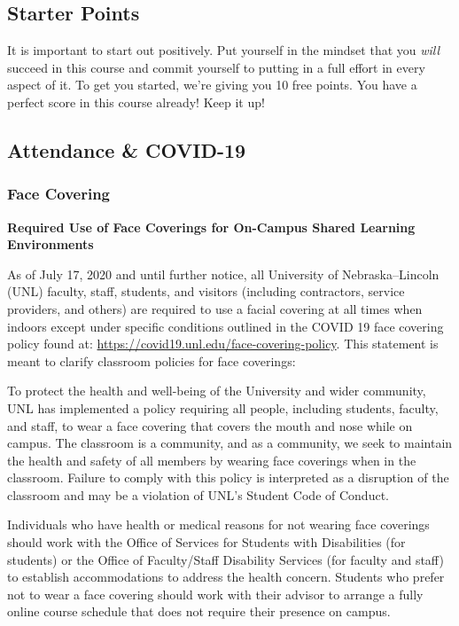 \documentclass[12pt]{scrartcl}
\begin{document}
\subsection{Starter Points}

It is important to start out positively.  Put yourself in the mindset
that you \emph{will} succeed in this course and commit yourself to
putting in a full effort in every aspect of it.  To get you started,
we're giving you 10 free points.  You have a perfect score in this
course already!  Keep it up!

\subsection{Attendance \& COVID-19}

\subsubsection{Face Covering}

\textbf{Required Use of Face Coverings for On-Campus Shared Learning Environments}

As of July 17, 2020 and until further notice, all University of 
Nebraska--Lincoln (UNL) faculty, staff, students, and visitors 
(including contractors, service providers, and others) are required 
to use a facial covering at all times when indoors except under 
specific conditions outlined in the COVID 19 face covering policy 
found at: \url{https://covid19.unl.edu/face-covering-policy}. This 
statement is meant to clarify classroom policies for face coverings:

To protect the health and well-being of the University and wider 
community, UNL has implemented a policy requiring all people, 
including students, faculty, and staff, to wear a face covering 
that covers the mouth and nose while on campus. The classroom is 
a community, and as a community, we seek to maintain the health 
and safety of all members by wearing face coverings when in the 
classroom. Failure to comply with this policy is interpreted as 
a disruption of the classroom and may be a violation of UNL's 
Student Code of Conduct.

Individuals who have health or medical reasons for not wearing 
face coverings should work with the Office of Services for 
Students with Disabilities (for students) or the Office of 
Faculty/Staff Disability Services (for faculty and staff) to 
establish accommodations to address the health concern. Students 
who prefer not to wear a face covering should work with their 
advisor to arrange a fully online course schedule that does 
not require their presence on campus.
\end{document}
